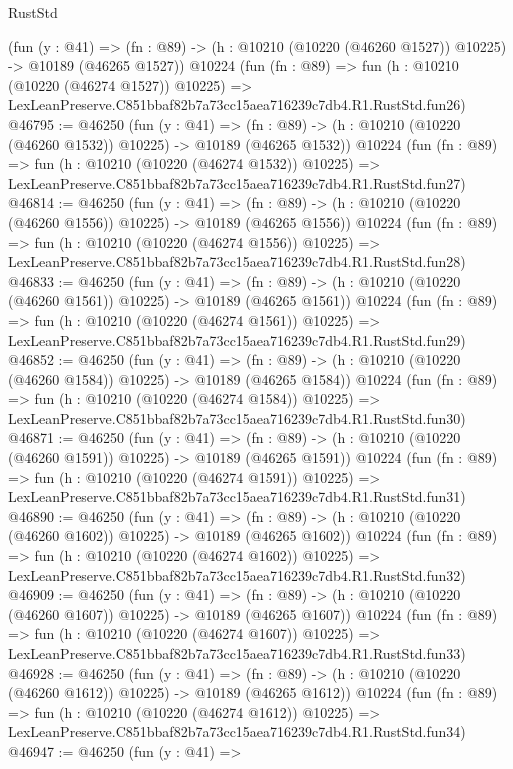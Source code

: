 \begin{lexlean}{RustStd}
\begin{coremodule}
    (fun (y : @41) =>
    (fn : @89) -> (h : @10210 (@10220 (@46260 @1527)) @10225) -> @10189 (@46265 @1527))
    @10224
    (fun (fn : @89) =>
    fun (h : @10210 (@10220 (@46274 @1527)) @10225) =>
    LexLeanPreserve.C851bbaf82b7a73cc15aea716239c7db4.R1.RustStd.fun26)
@46795 := @46250
    (fun (y : @41) =>
    (fn : @89) -> (h : @10210 (@10220 (@46260 @1532)) @10225) -> @10189 (@46265 @1532))
    @10224
    (fun (fn : @89) =>
    fun (h : @10210 (@10220 (@46274 @1532)) @10225) =>
    LexLeanPreserve.C851bbaf82b7a73cc15aea716239c7db4.R1.RustStd.fun27)
@46814 := @46250
    (fun (y : @41) =>
    (fn : @89) -> (h : @10210 (@10220 (@46260 @1556)) @10225) -> @10189 (@46265 @1556))
    @10224
    (fun (fn : @89) =>
    fun (h : @10210 (@10220 (@46274 @1556)) @10225) =>
    LexLeanPreserve.C851bbaf82b7a73cc15aea716239c7db4.R1.RustStd.fun28)
@46833 := @46250
    (fun (y : @41) =>
    (fn : @89) -> (h : @10210 (@10220 (@46260 @1561)) @10225) -> @10189 (@46265 @1561))
    @10224
    (fun (fn : @89) =>
    fun (h : @10210 (@10220 (@46274 @1561)) @10225) =>
    LexLeanPreserve.C851bbaf82b7a73cc15aea716239c7db4.R1.RustStd.fun29)
@46852 := @46250
    (fun (y : @41) =>
    (fn : @89) -> (h : @10210 (@10220 (@46260 @1584)) @10225) -> @10189 (@46265 @1584))
    @10224
    (fun (fn : @89) =>
    fun (h : @10210 (@10220 (@46274 @1584)) @10225) =>
    LexLeanPreserve.C851bbaf82b7a73cc15aea716239c7db4.R1.RustStd.fun30)
@46871 := @46250
    (fun (y : @41) =>
    (fn : @89) -> (h : @10210 (@10220 (@46260 @1591)) @10225) -> @10189 (@46265 @1591))
    @10224
    (fun (fn : @89) =>
    fun (h : @10210 (@10220 (@46274 @1591)) @10225) =>
    LexLeanPreserve.C851bbaf82b7a73cc15aea716239c7db4.R1.RustStd.fun31)
@46890 := @46250
    (fun (y : @41) =>
    (fn : @89) -> (h : @10210 (@10220 (@46260 @1602)) @10225) -> @10189 (@46265 @1602))
    @10224
    (fun (fn : @89) =>
    fun (h : @10210 (@10220 (@46274 @1602)) @10225) =>
    LexLeanPreserve.C851bbaf82b7a73cc15aea716239c7db4.R1.RustStd.fun32)
@46909 := @46250
    (fun (y : @41) =>
    (fn : @89) -> (h : @10210 (@10220 (@46260 @1607)) @10225) -> @10189 (@46265 @1607))
    @10224
    (fun (fn : @89) =>
    fun (h : @10210 (@10220 (@46274 @1607)) @10225) =>
    LexLeanPreserve.C851bbaf82b7a73cc15aea716239c7db4.R1.RustStd.fun33)
@46928 := @46250
    (fun (y : @41) =>
    (fn : @89) -> (h : @10210 (@10220 (@46260 @1612)) @10225) -> @10189 (@46265 @1612))
    @10224
    (fun (fn : @89) =>
    fun (h : @10210 (@10220 (@46274 @1612)) @10225) =>
    LexLeanPreserve.C851bbaf82b7a73cc15aea716239c7db4.R1.RustStd.fun34)
@46947 := @46250
    (fun (y : @41) =>

\end{coremodule}
\end{lexlean}
